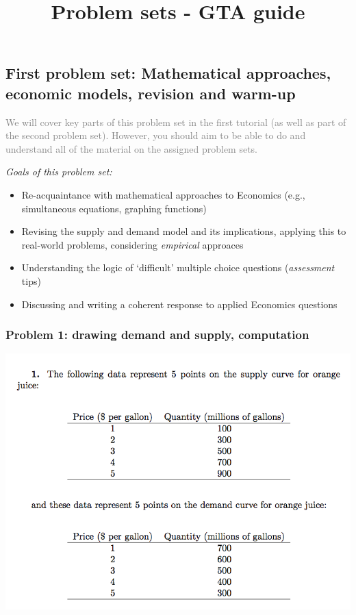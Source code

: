 \documentclass[]{article}
\title{Problem sets - GTA guide}
\author{}
\date{}
\begin{document}
\maketitle

\hypertarget{ps1}{%
\subsection*{First problem set: Mathematical approaches, economic
models, revision and warm-up}\label{ps1}}

\textcolor{Grey}{We will cover key parts of this problem set in the first tutorial (as well as part of the second problem set). However, you should aim to be able to do and understand all of the material on the assigned problem sets.}

\emph{Goals of this problem set:}

\begin{itemize}
\item
  Re-acquaintance with mathematical approaches to Economics (e.g.,
  simultaneous equations, graphing functions)
\item
  Revising the supply and demand model and its implications, applying
  this to real-world problems, considering \emph{empirical} approaces
\item
  Understanding the logic of `difficult' multiple choice questions
  (\emph{assessment} tips)
\item
  Discussing and writing a coherent response to applied Economics
  questions
\end{itemize}

\hypertarget{problem-1-drawing-demand-and-supply-computation}{%
\subsubsection*{Problem 1: drawing demand and supply,
computation}\label{problem-1-drawing-demand-and-supply-computation}}

\includegraphics{ns_prob1.png}
\end{document}
